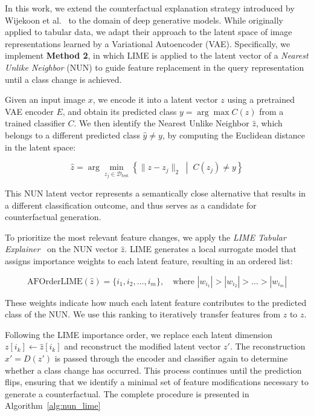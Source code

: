 In this work, we extend the counterfactual explanation strategy introduced by Wijekoon et al.~\cite{WijekoonWNMPC21} to the domain of deep generative models. While originally applied to tabular data, we adapt their approach to the latent space of image representations learned by a Variational Autoencoder (VAE). Specifically, we implement \textbf{Method 2}, in which LIME is applied to the latent vector of a \textit{Nearest Unlike Neighbor} (NUN) to guide feature replacement in the query representation until a class change is achieved.


Given an input image \( x \), we encode it into a latent vector \( z \) using a pretrained VAE encoder \( E \), and obtain its predicted class \( y = \arg\max C(z) \) from a trained classifier \( C \). We then identify the Nearest Unlike Neighbor \( \hat{z} \), which belongs to a different predicted class \( \hat{y} \ne y \), by computing the Euclidean distance in the latent space:

\[
\hat{z} = \arg\min_{z_j \in \mathcal{D}_{\text{test}}} \left\{ \| z - z_j \|_2 \; \middle| \; C(z_j) \ne y \right\}
\]

This NUN latent vector represents a semantically close alternative that results in a different classification outcome, and thus serves as a candidate for counterfactual generation.


To prioritize the most relevant feature changes, we apply the \textit{LIME Tabular Explainer}~\cite{Ribeiro2018} on the NUN vector \( \hat{z} \). LIME generates a local surrogate model that assigns importance weights to each latent feature, resulting in an ordered list:

\[
\text{AFOrderLIME}(\hat{z}) = \{ i_1, i_2, \dots, i_m \}, \quad \text{where } |w_{i_1}| > |w_{i_2}| > \dots > |w_{i_m}|
\]

These weights indicate how much each latent feature contributes to the predicted class of the NUN. We use this ranking to iteratively transfer features from \( \hat{z} \) to \( z \).


Following the LIME importance order, we replace each latent dimension \( z[i_k] \leftarrow \hat{z}[i_k] \) and reconstruct the modified latent vector \( z' \). The reconstruction \( x' = D(z') \) is passed through the encoder and classifier again to determine whether a class change has occurred. This process continues until the prediction flips, ensuring that we identify a minimal set of feature modifications necessary to generate a counterfactual. The complete procedure is presented in Algorithm~\ref{alg:nun_lime}

